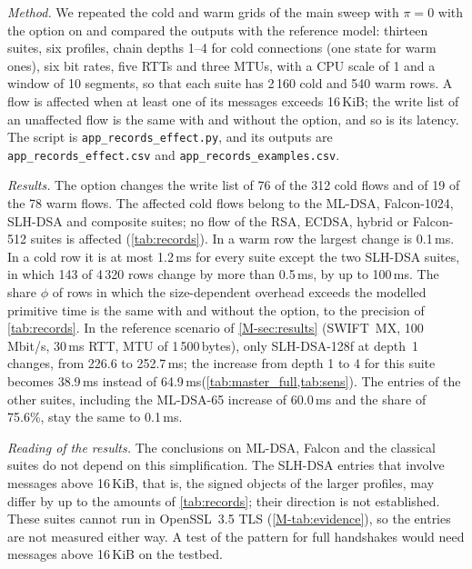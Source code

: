 \documentclass[preprint,12pt]{elsarticle}
\newcommand{\ms}{\,ms\xspace}
\newcommand{\Mbits}{\,Mbit/s\xspace}
\begin{document}
\emph{Method.} We repeated the cold and warm grids of the main sweep with $\pi=0$ with the option on and compared the outputs with the reference model: thirteen suites, six profiles, chain depths 1--4 for cold connections (one state for warm ones), six bit rates, five RTTs and three MTUs, with a CPU scale of 1 and a window of 10 segments, so that each suite has 2\,160 cold and 540 warm rows. A flow is affected when at least one of its messages exceeds 16\,KiB; the write list of an unaffected flow is the same with and without the option, and so is its latency. The script is \texttt{app\_records\_effect.py}, and its outputs are \texttt{app\_records\_effect.csv} and \texttt{app\_records\_examples.csv}.

\emph{Results.} The option changes the write list of 76 of the 312 cold flows and of 19 of the 78 warm flows. The affected cold flows belong to the ML-DSA, Falcon-1024, SLH-DSA and composite suites; no flow of the RSA, ECDSA, hybrid or Falcon-512 suites is affected (\cref{tab:records}). In a warm row the largest change is 0.1\,ms. In a cold row it is at most 1.2\,ms for every suite except the two SLH-DSA suites, in which 143 of 4\,320 rows change by more than 0.5\,ms, by up to 100\,ms. The share $\phi$ of rows in which the size-dependent overhead exceeds the modelled primitive time is the same with and without the option, to the precision of \cref{tab:records}. In the reference scenario of \cref{M-sec:results} (SWIFT~MX, 100\Mbits, 30\ms RTT, MTU of 1\,500\,bytes), only SLH-DSA-128f at depth~1 changes, from 226.6 to 252.7\ms; the increase from depth 1 to 4 for this suite becomes 38.9\ms instead of 64.9\ms (\cref{tab:master_full,tab:sens}). The entries of the other suites, including the ML-DSA-65 increase of 60.0\ms and the share of 75.6\%, stay the same to 0.1\ms.

\emph{Reading of the results.} The conclusions on ML-DSA, Falcon and the classical suites do not depend on this simplification. The SLH-DSA entries that involve messages above 16\,KiB, that is, the signed objects of the larger profiles, may differ by up to the amounts of \cref{tab:records}; their direction is not established. These suites cannot run in OpenSSL~3.5 TLS (\cref{M-tab:evidence}), so the entries are not measured either way. A test of the pattern for full handshakes would need messages above 16\,KiB on the testbed.
\end{document}
